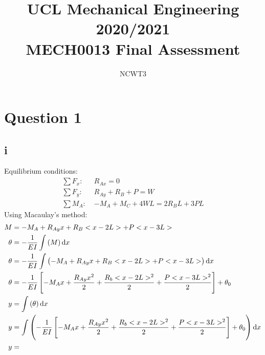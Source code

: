 \documentclass[11pt]{article}
\numberwithin{equation}{section}
\begin{document}
\title{\textbf{UCL Mechanical Engineering 2020/2021}\\MECH0013 Final Assessment}
\author{NCWT3}
\maketitle
\tableofcontents
\listoffigures
\section{Question 1}
\subsection{i}
Equilibrium conditions:
\begin{align}
    \sum F_x: \; &R_{Ax} = 0\\
    \sum F_y: \; &R_{Ay} + R_B + P = W\\
    \sum M_A: \; &-M_A + M_C + 4WL = 2R_B L + 3PL
\end{align}
Using Macaulay's method:
\begin{align}
    M &= -M_A + R_{Ay}x + R_B <x- 2L> + P<x-3L>\\
    \theta &= - \frac{1}{EI} \int \left(M\right)\dif x\\
    \theta &= -\frac{1}{EI} \int \left(-M_A + R_{Ay}x + R_B <x- 2L> + P<x-3L>\right) \dif x\\
    \theta &= -\frac{1}{EI} \left[-M_A x + \frac{R_{Ay}x^2}{2} + \frac{R_b<x - 2L>^2}{2} + \frac{P<x-3L>^2}{2}\right] + \theta_0\\
    y &= \int \left(\theta\right) \dif x\\
    y &= \int \left(-\frac{1}{EI} \left[-M_A x + \frac{R_{Ay}x^2}{2} + \frac{R_b<x - 2L>^2}{2} + \frac{P<x-3L>^2}{2}\right] + \theta_0\right) \dif x\\
    y &= 
\end{align}
\end{document}
